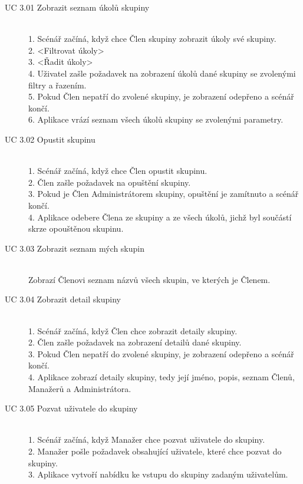 \documentclass[thesis=B,czech]{FITthesis}[2012/06/26]
\begin{document}
			\begin{description}
				\item[UC 3.01 Zobrazit seznam úkolů skupiny] \hfill \\
					1. Scénář začíná, když chce Člen skupiny zobrazit úkoly své skupiny. \\
					2. <Filtrovat úkoly> \\
					3. <Řadit úkoly> \\
					4. Uživatel zašle požadavek na zobrazení úkolů dané skupiny se zvolenými filtry a řazením. \\
					5. Pokud Člen nepatří do zvolené skupiny, je zobrazení odepřeno a scénář končí. \\
					6. Aplikace vrází seznam všech úkolů skupiny se zvolenými parametry. \\
					
				\item[UC 3.02 Opustit skupinu] \hfill \\
					1. Scénář začíná, když chce Člen opustit skupinu. \\
					2. Člen zašle požadavek na opuštění skupiny. \\
					3. Pokud je Člen Administrátorem skupiny, opuštění je zamítnuto a scénář končí. \\
					4. Aplikace odebere Člena ze skupiny a ze všech úkolů, jichž byl součástí skrze opouštěnou skupinu.
				
				\item[UC 3.03 Zobrazit seznam mých skupin] \hfill \\
					Zobrazí Členovi seznam názvů všech skupin, ve kterých je Členem.
				
				\item[UC 3.04 Zobrazit detail skupiny] \hfill \\
					1. Scénář začíná, když Člen chce zobrazit detaily skupiny. \\
					2. Člen zašle požadavek na zobrazení detailů dané skupiny. \\
					3. Pokud Člen nepatří do zvolené skupiny, je zobrazení odepřeno a scénář končí. \\
					4. Aplikace zobrazí detaily skupiny, tedy její jméno, popis, seznam Členů, Manažerů a Administrátora.
				
				\item[UC 3.05 Pozvat uživatele do skupiny] \hfill \\
					1. Scénář začíná, když Manažer chce pozvat uživatele do skupiny. \\
					2. Manažer pošle požadavek obsahující uživatele, které chce pozvat do skupiny. \\
					3. Aplikace vytvoří nabídku ke vstupu do skupiny zadaným uživatelům. \\
				

\end{description}
\end{document}
